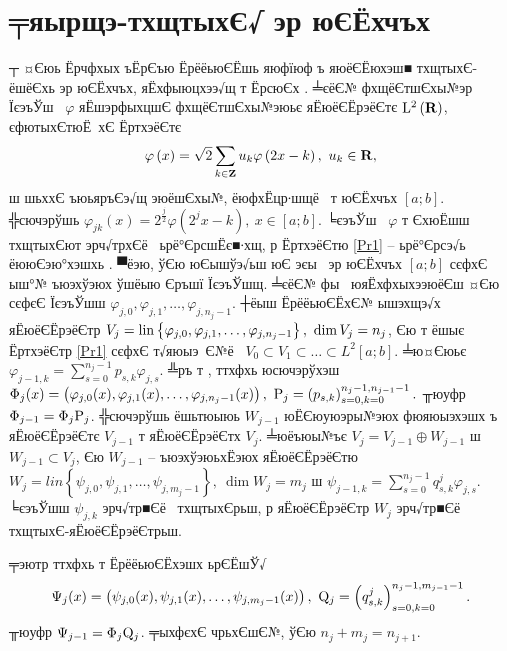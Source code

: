 \documentclass[12pt, a4paper, oneside]{article}
\begin{document}
\section{╤яырщэ-тхщтыхЄ√ эр юЄЁхчъх}
┬ ¤Єюь Ёрчфхых  ъЁрЄъю ЁрёёьюЄЁшь яюфїюф ъ яюёЄЁюхэш■ тхщтыхЄ-ёшёЄхь эр юЄЁхчъх, яЁхфыюцхээ√щ т ЁрсюЄх \cite{ArticleFinkelstein}. ╧єёЄ№ фхщёЄтшЄхы№эр  ЇєэъЎш  $\varphi $ яЁшэрфыхцшЄ фхщёЄтшЄхы№эюьє яЁюёЄЁрэёЄтє $\mathrm{L}^{2} \left({\bf R}\right)$, єфютыхЄтюЁ хЄ ЁртхэёЄтє
\begin{equation} \label{Pr1}
\varphi \left(x\right)=\sqrt{2} \sum _{k\in {\bf Z}}u_{k} \varphi \left(2x-k\right),~u_{k} \in {\bf R},
\end{equation}
ш шьххЄ ъюьяръЄэ√щ эюёшЄхы№, ёюфхЁцр∙шщё  т юЄЁхчъх $[a;b]$. ╬сючэрўшь $\varphi _{jk} (x)=2^{\frac{j}{2}}\varphi \left(2^{j} x-k\right),~x\in [a;b]$. ╘єэъЎш  $\varphi $ т ЄхюЁшш тхщтыхЄют эрч√трхЄё  ьрё°ЄрсшЁє■∙хщ, р ЁртхэёЄтю \eqref{Pr1} -- ьрё°Єрсэ√ь ёююЄэю°хэшхь \cite{Frazer}. ▀ёэю, ўЄю юЄышўэ√ьш юЄ эєы  эр юЄЁхчъх $[a;b]$ сєфхЄ ыш°№ ъюэхўэюх ўшёыю Єръшї ЇєэъЎшщ. ╧єёЄ№ фы  юяЁхфхыхээюёЄш ¤Єю сєфєЄ ЇєэъЎшш $\varphi _{j,0} ,\varphi _{j,1} ,\dots,\varphi _{j,n_{j} -1} $. ┼ёыш ЁрёёьюЄЁхЄ№ ышэхщэ√х яЁюёЄЁрэёЄтр $ V_{j} = {\rm lin}\left\{\varphi _{j,0} ,\varphi _{j,1} ,\dots,\varphi _{j,n_{j} -1} \right\},~\dim V_{j} =n_{j}$, Єю  т ёшыє ЁртхэёЄтр \eqref{Pr1}  сєфхЄ т√яюыэ Є№ё  $V_{0} \subset V_{1} \subset \ldots \subset L^{2} \left[a;b\right]$. ╧ю¤Єюьє $\varphi _{j-1,k} =\sum\limits _{s=0}^{n_{j} -1}p_{s,k} \varphi _{j,s}  $. ╩ръ т  \cite{ArticleFinkelstein}, ттхфхь юсючэрўхэш  $\Phi _{j} (x)=\left(\varphi _{j,0} (x),\varphi _{j,1} (x),\dots,\varphi _{j,n_{j} -1} (x)\right),~{\rm P}_{j} =\left(p_{s,k} \right)_{s=0, k=0}^{n_{j} -1, n_{j-1} -1}.$
╥юуфр $\Phi _{j-1} =\Phi _{j} {\rm P}_{j} $. ╬сючэрўшь ёшьтюыюь $W_{j-1} $ юЁЄюуюэры№эюх фюяюыэхэшх ъ яЁюёЄЁрэёЄтє $V_{j-1} $ т яЁюёЄЁрэёЄтх $V_{j} $. ╧юёъюы№ъє $V_{j} =V_{j-1} \oplus W_{j-1} $ ш $W_{j-1} \subset V_{j} $, Єю $W_{j-1} $ -- ъюэхўэюьхЁэюх яЁюёЄЁрэёЄтю $ W_{j}  = lin \left\{\psi _{j,0} ,\psi _{j,1} ,\dots,\psi _{j,m_{j} -1} \right\},~\dim W_{j} =m_{j}$ ш
$\psi _{j-1,k} =\sum\limits_{s=0}^{n_{j} -1}q_{s,k}^{j} \varphi _{j,s}. $ ╘єэъЎшш $\psi _{j,k} $ эрч√тр■Єё  тхщтыхЄрьш, р  яЁюёЄЁрэёЄтр $W_{j} $ эрч√тр■Єё  тхщтыхЄ-яЁюёЄЁрэёЄтрьш.
\par ╤эютр ттхфхь т ЁрёёьюЄЁхэшх ьрЄЁшЎ√ \cite{ArticleFinkelstein}
\[
\Psi _{j} (x)=\left(\psi _{j,0} (x),\psi _{j,1} (x),\dots,\psi_{j,m_{j} -1} (x)\right),~{\rm Q}_{j}=\left(q_{s,k}^{j} \right)_{s=0, k=0}^{n_{j}-1,m_{j-1}-1}.
\]
╥юуфр $\Psi _{j-1} =\Phi _{j} {\rm Q}_{j} $. ╤ыхфєхЄ чрьхЄшЄ№, ўЄю $n_{j} +m_{j} =n_{j+1} $.
\end{document}
